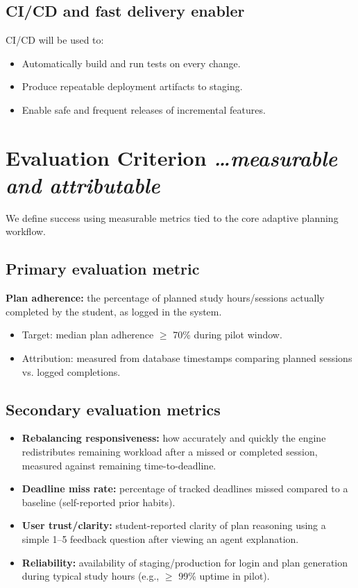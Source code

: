 \documentclass[11pt,a4paper]{article}
\newcommand{\BvrHint}[1]{%
  {\normalfont\normalsize\itshape\hfill #1}}
\begin{document}
\subsection{CI/CD and fast delivery enabler}
CI/CD will be used to:
\begin{itemize}[leftmargin=0.7cm]
    \item Automatically build and run tests on every change.
    \item Produce repeatable deployment artifacts to staging.
    \item Enable safe and frequent releases of incremental features.
\end{itemize}

\section{Evaluation Criterion %
\BvrHint{\ldots measurable and attributable}}
We define success using measurable metrics tied to the core adaptive
planning workflow.

\subsection{Primary evaluation metric}
\textbf{Plan adherence:} the percentage of planned study hours/sessions actually completed by the student, as logged in the system.
\begin{itemize}[leftmargin=0.7cm]
    \item Target: median plan adherence $\ge$ 70\% during pilot window.
    \item Attribution: measured from database timestamps comparing planned sessions vs. logged completions.
\end{itemize}

\subsection{Secondary evaluation metrics}
\begin{itemize}[leftmargin=0.7cm]
    \item \textbf{Rebalancing responsiveness:} how accurately and quickly the engine redistributes remaining workload after a missed or completed session, measured against remaining time-to-deadline.
    \item \textbf{Deadline miss rate:} percentage of tracked deadlines missed compared to a baseline (self-reported prior habits).
    \item \textbf{User trust/clarity:} student-reported clarity of plan reasoning using a simple 1--5 feedback question after viewing an agent explanation.
    \item \textbf{Reliability:} availability of staging/production for login and plan generation during typical study hours (e.g., $\ge$ 99\% uptime in pilot).
\end{itemize}
\end{document}
